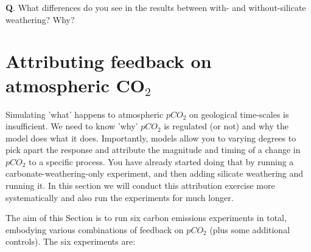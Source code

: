 \vspace{1mm}
\noindent \textbf{Q}. What differences do you see in the results between with- and without-silicate weathering? Why?

\newpage

\section{Attributing feedback on atmospheric CO$_{2}$}

Simulating 'what' happens to atmospheric $pCO_{2}$ on geological time-scales is insufficient. We need to know 'why' $pCO_{2}$ is regulated (or not) and why the model does what it does. Importantly, models allow you to varying degrees to pick apart the response and attribute the magnitude and timing of a change in $pCO_{2}$ to a specific process. You have already started doing that by running a carbonate-weathering-only experiment, and then adding silicate weathering and running it. In this section we will conduct this attribution exercise more systematically and also run the experiments for much longer.

\vspace{1mm}
\noindent The aim of this Section is to run six carbon emissions experiments in total, embodying various combinations of feedback on $pCO_{2}$ (plus some additional controls). The six experiments are:

